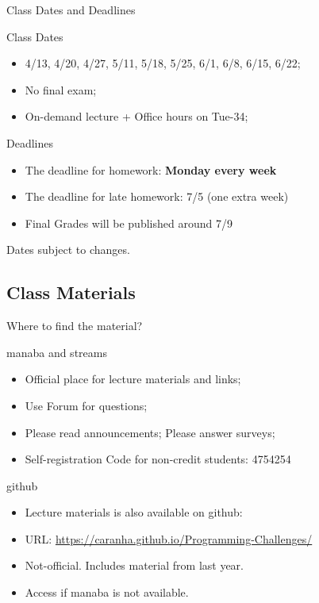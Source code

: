 \begin{frame}{Class Dates and Deadlines}
  \begin{block}{Class Dates}
    \begin{itemize}
    \item 4/13, 4/20, 4/27, 5/11, 5/18, 5/25, 6/1, 6/8, 6/15, 6/22;
    \item No final exam;
    \item On-demand lecture + Office hours on Tue-34;
    \end{itemize}
  \end{block}
  \begin{block}{Deadlines}
    \begin{itemize}
      \item The deadline for homework: {\bf Monday every week}
      \item The deadline for late homework: 7/5 (one extra week)
      \item Final Grades will be published around 7/9
    \end{itemize}
  \end{block}
  Dates subject to changes.
\end{frame}

\subsection{Class Materials}
\begin{frame}{Where to find the material?}
  \begin{block}{manaba and streams}
    \begin{itemize}
      \item Official place for lecture materials and links;
      \item Use Forum for questions;
      \item Please read announcements; Please answer surveys;
      \item Self-registration Code for non-credit students: 4754254
    \end{itemize}
  \end{block}
  \begin{block}{github}
    \begin{itemize}
      \item Lecture materials is also available on github:
      \item URL: \url{https://caranha.github.io/Programming-Challenges/}
      \item Not-official. Includes material from last year.
      \item Access if manaba is not available.
    \end{itemize}
  \end{block}
\end{frame}

